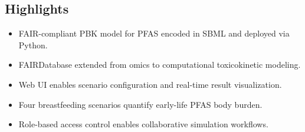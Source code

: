 \documentclass[preprint,12pt]{elsarticle}
\begin{document}
\begin{linenumbers}


\section*{Highlights}
\begin{itemize}
  \item FAIR-compliant PBK model for PFAS encoded in SBML and deployed via Python.
  \item FAIRDatabase extended from omics to computational toxicokinetic modeling.
  \item Web UI enables scenario configuration and real-time result visualization.
  \item Four breastfeeding scenarios quantify early-life PFAS body burden.
  \item Role-based access control enables collaborative simulation workflows.
\end{itemize}


\end{linenumbers}
\end{document}
